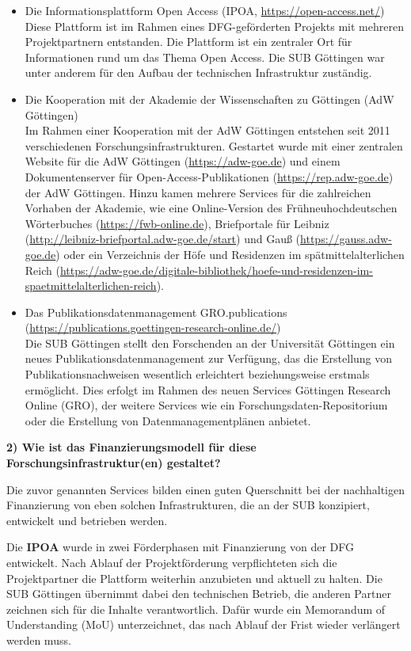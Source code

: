 \documentclass[a4paper,
fontsize=11pt,
oneside,
numbers=noperiodatend,
parskip=half-,
bibliography=totoc,
final
]{scrartcl}
\begin{document}
\begin{itemize}
\item
  Die Informationsplattform Open Access (IPOA,
  \url{https://open-access.net/})\\
  Diese Plattform ist im Rahmen eines DFG-geförderten Projekts mit
  mehreren Projektpartnern entstanden. Die Plattform ist ein zentraler
  Ort für Informationen rund um das Thema Open Access. Die SUB Göttingen
  war unter anderem für den Aufbau der technischen Infrastruktur
  zuständig.
\item
  Die Kooperation mit der Akademie der Wissenschaften zu Göttingen (AdW
  Göttingen)\\
  Im Rahmen einer Kooperation mit der AdW Göttingen entstehen seit 2011
  verschiedenen Forschungsinfrastrukturen. Gestartet wurde mit einer
  zentralen Website für die AdW Göttingen (\url{https://adw-goe.de}) und
  einem Dokumentenserver für Open-Access-Publikationen
  (\url{https://rep.adw-goe.de}) der AdW Göttingen. Hinzu kamen mehrere
  Services für die zahlreichen Vorhaben der Akademie, wie eine
  Online-Version des Frühneuhochdeutschen Wörterbuches
  (\url{https://fwb-online.de}), Briefportale für Leibniz
  (\url{http://leibniz-briefportal.adw-goe.de/start}) und Gauß
  (\url{https://gauss.adw-goe.de}) oder ein Verzeichnis der Höfe und
  Residenzen im spätmittelalterlichen Reich
  (\url{https://adw-goe.de/digitale-bibliothek/hoefe-und-residenzen-im-spaetmittelalterlichen-reich}).
\item
  Das Publikationsdatenmanagement GRO.publications
  (\url{https://publications.goettingen-research-online.de/})\\
  Die SUB Göttingen stellt den Forschenden an der Universität Göttingen
  ein neues Publikationsdatenmanagement zur Verfügung, das die
  Erstellung von Publikationsnachweisen wesentlich erleichtert
  beziehungsweise erstmals ermöglicht. Dies erfolgt im Rahmen des neuen
  Services Göttingen Research Online (GRO), der weitere Services wie ein
  Forschungs\-daten-Repositorium oder die Erstellung von
  Datenmanagementplänen anbietet.
\end{itemize}

\textbf{2) Wie ist das Finanzierungsmodell für diese
Forschungsinfrastruktur(en) gestaltet?}

Die zuvor genannten Services bilden einen guten Querschnitt bei der
nachhaltigen Finanzierung von eben solchen Infrastrukturen, die an der
SUB konzipiert, entwickelt und betrieben werden.

Die \textbf{IPOA} wurde in zwei Förderphasen mit Finanzierung von der
DFG entwickelt. Nach Ablauf der Projektförderung verpflichteten sich die
Projektpartner die Plattform weiterhin anzubieten und aktuell zu halten.
Die SUB Göttingen übernimmt dabei den technischen Betrieb, die anderen
Partner zeichnen sich für die Inhalte verantwortlich. Dafür wurde ein
Memorandum of Understanding (MoU) unterzeichnet, das nach Ablauf der
Frist wieder verlängert werden muss.
\end{document}

